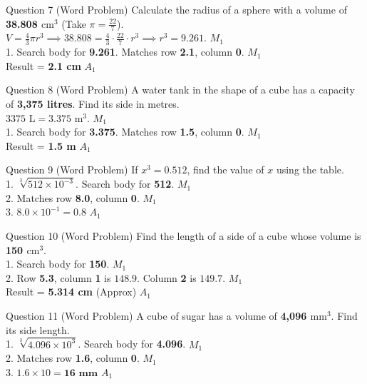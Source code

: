 \documentclass[12pt, a4paper, oneside]{article}
\begin{document}
\begin{solvingbox}{Question 7 (Word Problem)}
Calculate the radius of a sphere with a volume of \textbf{38.808 $\text{cm}^3$} (Take $\pi = \frac{22}{7}$). \\
$V = \frac{4}{3}\pi r^3 \implies 38.808 = \frac{4}{3} \cdot \frac{22}{7} \cdot r^3 \implies r^3 = 9.261$. \hfill $M_1$ \\
1. Search body for \textbf{9.261}. Matches row \textbf{2.1}, column \textbf{0}. \hfill $M_1$ \\
Result = \textbf{2.1 cm} \hfill $A_1$
\end{solvingbox}

\begin{solvingbox}{Question 8 (Word Problem)}
A water tank in the shape of a cube has a capacity of \textbf{3,375 litres}. Find its side in metres. \\
$3375\text{ L} = 3.375\text{ m}^3$. \hfill $M_1$ \\
1. Search body for \textbf{3.375}. Matches row \textbf{1.5}, column \textbf{0}. \hfill $M_1$ \\
Result = \textbf{1.5 m} \hfill $A_1$
\end{solvingbox}

\begin{solvingbox}{Question 9 (Word Problem)}
If $x^3 = 0.512$, find the value of $x$ using the table. \\
1. $\sqrt[3]{512 \times 10^{-3}}$. Search body for \textbf{512}. \hfill $M_1$ \\
2. Matches row \textbf{8.0}, column \textbf{0}. \hfill $M_1$ \\
3. $8.0 \times 10^{-1} = \mathbf{0.8}$ \hfill $A_1$
\end{solvingbox}

\begin{solvingbox}{Question 10 (Word Problem)}
Find the length of a side of a cube whose volume is \textbf{150 $\text{cm}^3$}. \\
1. Search body for \textbf{150}. \hfill $M_1$ \\
2. Row \textbf{5.3}, column \textbf{1} is $148.9$. Column \textbf{2} is $149.7$. \hfill $M_1$ \\
Result = \textbf{5.314 cm} (Approx) \hfill $A_1$
\end{solvingbox}

\begin{solvingbox}{Question 11 (Word Problem)}
A cube of sugar has a volume of \textbf{4,096 $\text{mm}^3$}. Find its side length. \\
1. $\sqrt[3]{4.096 \times 10^3}$. Search body for \textbf{4.096}. \hfill $M_1$ \\
2. Matches row \textbf{1.6}, column \textbf{0}. \hfill $M_1$ \\
3. $1.6 \times 10 = \mathbf{16\text{ mm}}$ \hfill $A_1$
\end{solvingbox}
\end{document}
